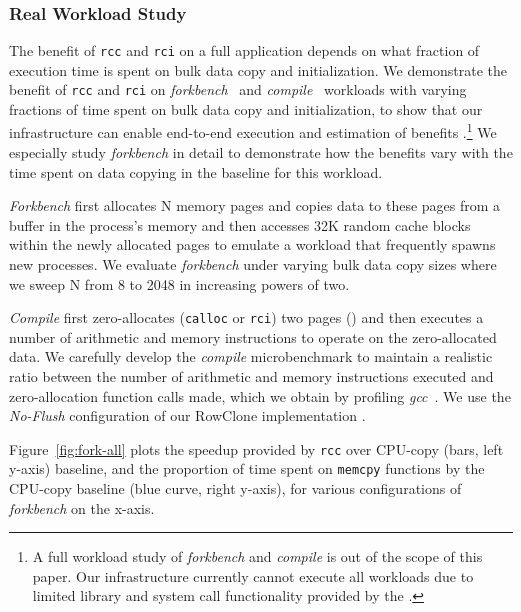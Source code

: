 \subsubsection{{Real Workload Study}}
\label{sec:real-workload-study}
{The benefit of \texttt{rcc} and \texttt{rci} on a full application depends on what fraction of execution time is spent on bulk data copy and initialization. We demonstrate the benefit of \texttt{rcc} and \texttt{rci} on \emph{forkbench}~\cite{seshadri2013rowclone} and \emph{compile}~\cite{seshadri2013rowclone} workloads with varying fractions of time spent on bulk data copy and initialization, to show that our infrastructure can enable end-to-end execution and estimation of benefits .\footnote{A full workload study  of \emph{forkbench} and \emph{compile} is out of the scope of this paper. Our infrastructure currently cannot execute all  workloads due to  limited library and system call functionality provided by the .} We especially study \emph{forkbench} in detail to demonstrate how the benefits vary with the time spent on data copying in the baseline for this workload.}

{\emph{Forkbench} first allocates N memory pages and copies data to these pages from a buffer in the process's memory and then accesses 32K random cache blocks within the newly allocated pages to emulate a workload that frequently spawns new processes. We evaluate \emph{forkbench} under varying bulk data copy sizes where we sweep N from 8 to {2048} in increasing powers of two. 

\emph{Compile} first zero-allocates (\texttt{calloc} or \texttt{rci}) two pages () and then executes a number of arithmetic and memory instructions to operate on the zero-allocated data. We carefully develop the \emph{compile} microbenchmark to maintain a realistic ratio between the number of arithmetic and memory instructions executed and zero-allocation function calls made, which we obtain by profiling \emph{gcc}~\cite{perfLinux}. We use the \emph{No-Flush} configuration of our RowClone implementation .}

{Figure~\ref{fig:fork-all} plots the speedup provided by \texttt{rcc} over  CPU-copy (bars, left y-axis) baseline, and the proportion of time spent on \texttt{memcpy} functions by the CPU-copy baseline (blue curve, right y-axis), for various configurations of \emph{forkbench} on the x-axis.}

